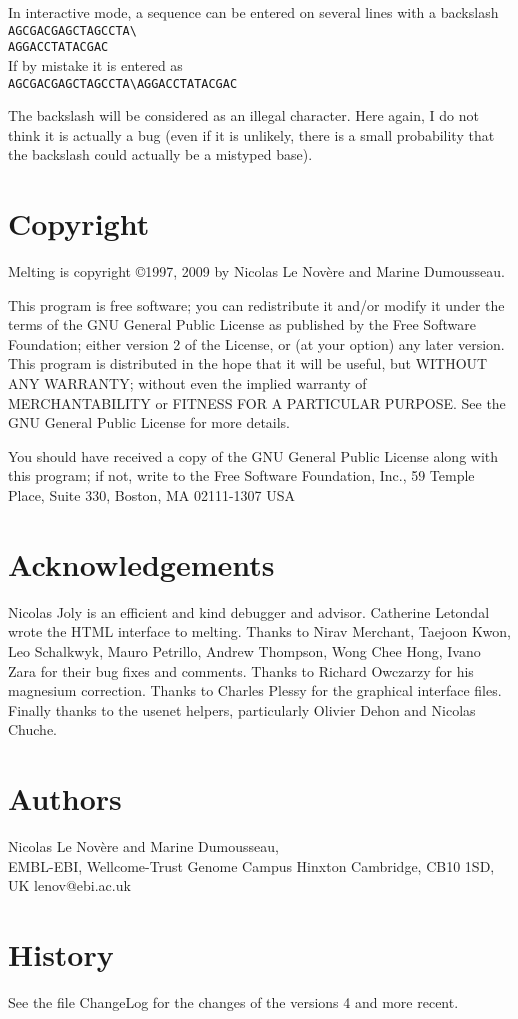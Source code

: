 \documentclass{article}
\begin{document}
In interactive mode, a sequence can be entered on several lines with a backslash\\
\texttt{AGCGACGAGCTAGCCTA{\textbackslash}\\
AGGACCTATACGAC}\\
If by mistake it is entered as  \\
\texttt{AGCGACGAGCTAGCCTA{\textbackslash}{}AGGACCTATACGAC}

The backslash will be considered 
 as an illegal character. Here again, I do not think it is actually a bug 
(even if it is unlikely, there is a small probability that the  backslash 
could actually be a mistyped base).   
   
\section{Copyright }
Melting is copyright 
\copyright 1997, 2009 by Nicolas Le Nov\`ere and Marine Dumousseau.  

This program is free software; 
you can redistribute it and/or modify it under the terms of the GNU General 
Public License as published by the Free Software Foundation; either version 
2 of the License, or (at your option) any later version.   
  This program 
is distributed in the hope that it will be useful, but WITHOUT ANY WARRANTY; 
without even the implied warranty of MERCHANTABILITY or FITNESS FOR A 
PARTICULAR PURPOSE.  See the GNU General Public License for more details. 
  
  You should have received a copy of the GNU General Public License 
along with this program; if not, write to the Free Software Foundation, 
Inc., 59 Temple Place, Suite 330, Boston, MA  02111-1307 USA   
   
\section{Acknowledgements}
Nicolas Joly is an efficient and kind debugger and advisor.  Catherine
Letondal wrote the HTML interface to melting. Thanks to Nirav Merchant,
Taejoon Kwon, Leo Schalkwyk, Mauro Petrillo, Andrew Thompson, Wong Chee Hong, Ivano
Zara for their bug fixes and comments. Thanks to Richard Owczarzy for his magnesium 
correction. Thanks to Charles Plessy for the graphical interface files. Finally thanks
to the usenet helpers, particularly Olivier Dehon and Nicolas Chuche.

   
\section{Authors }
Nicolas Le Nov\`ere and Marine Dumousseau, \\
EMBL-EBI, 
Wellcome-Trust Genome Campus
Hinxton Cambridge, CB10 1SD, UK
lenov@ebi.ac.uk
  
\section{History }

See the file ChangeLog for the changes of the versions 4 and more recent.
\end{document}
